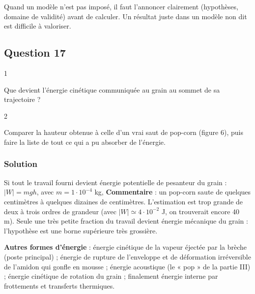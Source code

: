 \documentclass[11pt,a4paper]{article}
\newcommand{\equationajustee}[1]{%
  \sbox{\boiteequation}{$\displaystyle #1$}%
  \ifdim\wd\boiteequation>\linewidth
    \[\resizebox{\linewidth}{!}{\usebox{\boiteequation}}\]%
  \else
    \[#1\]%
  \fi}
\begin{document}
\begin{jury}

Quand un modèle n'est pas imposé, il faut l'annoncer clairement (hypothèses, domaine de validité) avant de calculer. Un résultat juste dans un modèle non dit est difficile à valoriser.

\end{jury}

\hypertarget{question-17}{%
\subsection{Question 17}\label{question-17}}

\begin{indication}{1}

Que devient l'énergie cinétique communiquée au grain au sommet de sa trajectoire ?

\end{indication}

\begin{indication}{2}

Comparer la hauteur obtenue à celle d'un vrai saut de pop-corn (figure 6), puis faire la liste de tout ce qui a pu absorber de l'énergie.

\end{indication}

\hypertarget{solution-16}{%
\subsubsection{Solution}\label{solution-16}}

Si tout le travail fourni devient énergie potentielle de pesanteur du grain : \(|W|=mgh\), avec \(m=1\cdot10^{-4}\) kg,
\equationajustee{\begin{aligned}
h&=\frac{|W|}{mg}\\
&=\frac{1{,}4\cdot10^{-1}}{1\cdot10^{-4}\times10}
\end{aligned}}
\equationajustee{\boxed{h\simeq1{,}4\cdot10^2\ \mathrm m}}
\textbf{Commentaire} : un pop-corn saute de quelques centimètres à quelques dizaines de centimètres. L'estimation est trop grande de deux à trois ordres de grandeur (avec \(|W|\simeq4\cdot10^{-2}\) J, on trouverait encore 40 m). Seule une très petite fraction du travail devient énergie mécanique du grain : l'hypothèse est une borne supérieure très grossière.

\textbf{Autres formes d'énergie} : énergie cinétique de la vapeur éjectée par la brèche (poste principal) ; énergie de rupture de l'enveloppe et de déformation irréversible de l'amidon qui gonfle en mousse ; énergie acoustique (le « pop » de la partie III) ; énergie cinétique de rotation du grain ; finalement énergie interne par frottements et transferts thermiques.
\end{document}
